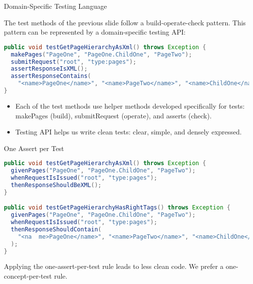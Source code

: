 \documentclass{beamer}
\begin{document}
\begin{frame}[fragile]{Domain-Specific Testing Language}


The test methods of the previous slide follow a build-operate-check pattern.  This pattern can be represented by a domain-specific testing API:
\begin{lstlisting}[language=Java]
public void testGetPageHierarchyAsXml() throws Exception { 
  makePages("PageOne", "PageOne.ChildOne", "PageTwo");
  submitRequest("root", "type:pages");
  assertResponseIsXML();
  assertResponseContains(
    "<name>PageOne</name>", "<name>PageTwo</name>", "<name>ChildOne</name>" );
}
\end{lstlisting}

\begin{itemize}
\item Each of the test methods use helper methods developed specifically for tests: makePages (build), submitRequest (operate), and asserts (check).
\item Testing API helps us write clean tests: clear, simple, and densely expressed.
\end{itemize}


\end{frame}

\begin{frame}[fragile]{One Assert per Test}


\begin{lstlisting}[language=Java]
public void testGetPageHierarchyAsXml() throws Exception {
  givenPages("PageOne", "PageOne.ChildOne", "PageTwo");
  whenRequestIsIssued("root", "type:pages");
  thenResponseShouldBeXML(); 
}

public void testGetPageHierarchyHasRightTags() throws Exception {
  givenPages("PageOne", "PageOne.ChildOne", "PageTwo");
  whenRequestIsIssued("root", "type:pages");
  thenResponseShouldContain(
    "<na  me>PageOne</name>", "<name>PageTwo</name>", "<name>ChildOne</name>"
  );
}
\end{lstlisting}

Applying the one-assert-per-test rule leads to less clean code.  We prefer a one-concept-per-test rule.

\end{frame}
\end{document}
